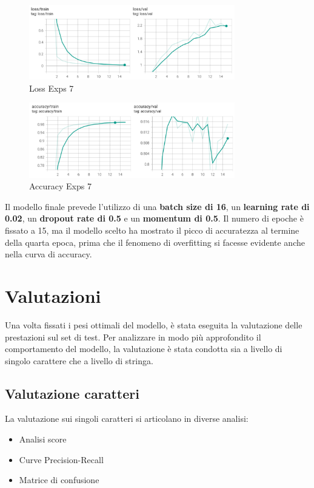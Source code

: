 \begin{figure}[htbp]
    \centering
    \includegraphics[width=0.8\textwidth]{images/exps7_loss.png}
    \caption{Loss Exps 7}
    \label{fig:exps7_loss}
\end{figure}

\begin{figure}[htbp]
    \centering
    \includegraphics[width=0.8\textwidth]{images/exps7_accuracy.png}
    \caption{Accuracy Exps 7}
    \label{fig:exps7_acc}
\end{figure}



Il modello finale prevede l'utilizzo di una \textbf{batch size di 16}, un \textbf{learning rate di 0.02}, un \textbf{dropout rate di 0.5} e un \textbf{momentum di 0.5}. Il numero di epoche è fissato a 15, ma il modello scelto ha mostrato il picco di accuratezza al termine della quarta epoca, prima che il fenomeno di overfitting si facesse evidente anche nella curva di accuracy.

\section{Valutazioni}
Una volta fissati i pesi ottimali del modello, è stata eseguita la valutazione delle prestazioni sul set di test. Per analizzare in modo più approfondito il comportamento del modello, la valutazione è stata condotta sia a livello di singolo carattere che a livello di stringa.

\subsection{Valutazione caratteri}
La valutazione sui singoli caratteri si articolano in diverse analisi:
\begin{itemize}
    \item Analisi score
    \item Curve Precision-Recall
    \item Matrice di confusione
\end{itemize}

